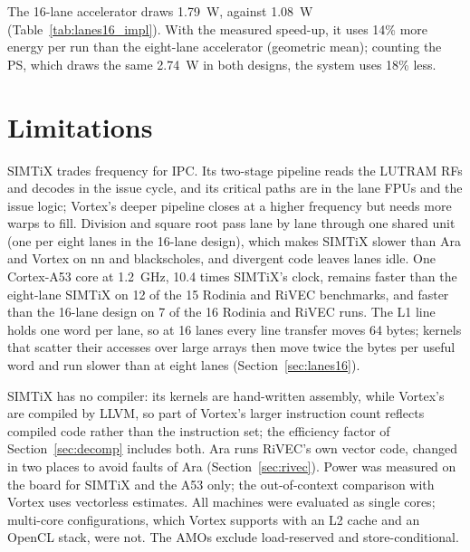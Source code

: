 \documentclass[journal]{IEEEtran}
\begin{document}
The 16-lane accelerator draws 1.79~W, against 1.08~W (Table~\ref{tab:lanes16_impl}).
With the measured speed-up, it uses 14\% more energy per run than the eight-lane
accelerator (geometric mean); counting the PS, which draws the same 2.74~W in both
designs, the system uses 18\% less.

\section{Limitations}\label{sec:disc}
SIMTiX trades frequency for IPC. Its two-stage pipeline reads the LUTRAM RFs and
decodes in the issue cycle, and its critical paths are in the lane FPUs and the
issue logic; Vortex's deeper pipeline closes at a higher frequency but needs more
warps to fill. Division and square root pass lane by lane through one shared unit
(one per eight lanes in the 16-lane design), which makes SIMTiX slower than Ara and
Vortex on nn and blackscholes, and divergent code leaves lanes idle. One Cortex-A53
core at 1.2~GHz, 10.4 times SIMTiX's clock, remains faster than the eight-lane
SIMTiX on 12 of the 15 Rodinia and RiVEC benchmarks, and faster than the 16-lane
design on 7 of the 16 Rodinia and RiVEC runs. The L1 line holds one word per lane,
so at 16 lanes every line transfer moves 64 bytes; kernels that scatter their
accesses over large arrays then move twice the bytes per useful word and run slower
than at eight lanes (Section~\ref{sec:lanes16}).

SIMTiX has no compiler: its kernels are hand-written assembly, while Vortex's are
compiled by LLVM, so part of Vortex's larger instruction count reflects compiled code
rather than the instruction set; the efficiency factor of Section~\ref{sec:decomp}
includes both. Ara runs RiVEC's own vector code, changed in two places to avoid
faults of Ara (Section~\ref{sec:rivec}). Power was measured on the board for SIMTiX
and the A53 only; the out-of-context comparison with Vortex uses vectorless
estimates. All machines were evaluated as single cores; multi-core configurations,
which Vortex supports with an L2 cache and an OpenCL stack, were not. The AMOs exclude
load-reserved and store-conditional.

\end{document}
